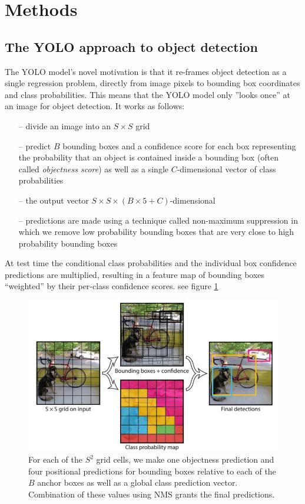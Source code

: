 \documentclass[a4paper]{article}
\begin{document}
\section{Methods}
\subsection*{The YOLO approach to object detection}
The YOLO model’s novel motivation is that it re-frames
object detection as a single regression problem, directly
from image pixels to bounding box coordinates and class
probabilities. This means that the YOLO model only ”looks
once” at an image for object detection.
It works as follows: 
\begin{itemize}
\item[--] divide an image into an $S\times S$ grid
\item[--]  predict $B$ bounding boxes and a confidence score for each box representing the probability that an object is contained inside a bounding box (often called \textit{objectness score}) as well as a single $C$-dimensional vector of class probabilities 
\item[--]  the output vector $S \times S \times (B\times 5 +C)$-dimensional
\item[--]  predictions are made using a technique called non-maximum suppression in which we remove low probability bounding boxes that are very close to high probability bounding boxes
\end{itemize}  At test time the conditional class probabilities and the individual box confidence predictions are multiplied, resulting in a feature map of bounding boxes ``weighted'' by their per-class confidence scores. see figure \ref{fig:yolo_model}
\begin{figure}
\label{fig:yolo_model}
\includegraphics[scale=0.35]{yolo_model}

\caption{For each of the $S^2$ grid cells, we make one objectness prediction and four positional predictions for bounding boxes relative to each of the $B$ anchor boxes as well as a global class prediction vector. Combination of these values using NMS grants the final predictions.}


\end{figure}
\end{document}
